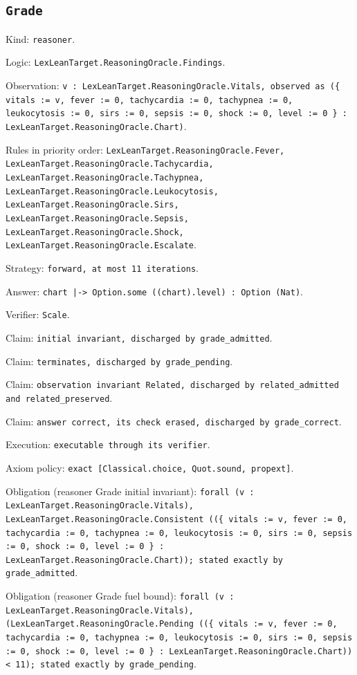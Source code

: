 \documentclass[11pt]{article}
\begin{document}
\subsection*{\texttt{Grade}}
\noindent Kind: \texttt{reasoner}.\par
\noindent Logic: \texttt{LexLeanTarget.ReasoningOracle.Findings}.\par
\noindent Observation: \texttt{v : LexLeanTarget.ReasoningOracle.Vitals, observed as (\{ vitals := v, fever := 0, tachycardia := 0, tachypnea := 0, leukocytosis := 0, sirs := 0, sepsis := 0, shock := 0, level := 0 \} : LexLeanTarget.ReasoningOracle.Chart)}.\par
\noindent Rules in priority order: \texttt{LexLeanTarget.ReasoningOracle.Fever, LexLeanTarget.ReasoningOracle.Tachycardia, LexLeanTarget.ReasoningOracle.Tachypnea, LexLeanTarget.ReasoningOracle.Leukocytosis, LexLeanTarget.ReasoningOracle.Sirs, LexLeanTarget.ReasoningOracle.Sepsis, LexLeanTarget.ReasoningOracle.Shock, LexLeanTarget.ReasoningOracle.Escalate}.\par
\noindent Strategy: \texttt{forward, at most 11 iterations}.\par
\noindent Answer: \texttt{chart |-> Option.some ((chart).level) : Option (Nat)}.\par
\noindent Verifier: \texttt{Scale}.\par
\noindent Claim: \texttt{initial invariant, discharged by grade\_admitted}.\par
\noindent Claim: \texttt{terminates, discharged by grade\_pending}.\par
\noindent Claim: \texttt{observation invariant Related, discharged by related\_admitted and related\_preserved}.\par
\noindent Claim: \texttt{answer correct, its check erased, discharged by grade\_correct}.\par
\noindent Execution: \texttt{executable through its verifier}.\par
\noindent Axiom policy: \texttt{exact [Classical.choice, Quot.sound, propext]}.\par
\noindent Obligation (reasoner Grade initial invariant): \texttt{forall (v : LexLeanTarget.ReasoningOracle.Vitals), LexLeanTarget.ReasoningOracle.Consistent ((\{ vitals := v, fever := 0, tachycardia := 0, tachypnea := 0, leukocytosis := 0, sirs := 0, sepsis := 0, shock := 0, level := 0 \} : LexLeanTarget.ReasoningOracle.Chart)); stated exactly by grade\_admitted}.\par
\noindent Obligation (reasoner Grade fuel bound): \texttt{forall (v : LexLeanTarget.ReasoningOracle.Vitals), (LexLeanTarget.ReasoningOracle.Pending ((\{ vitals := v, fever := 0, tachycardia := 0, tachypnea := 0, leukocytosis := 0, sirs := 0, sepsis := 0, shock := 0, level := 0 \} : LexLeanTarget.ReasoningOracle.Chart)) < 11); stated exactly by grade\_pending}.\par
\end{document}
